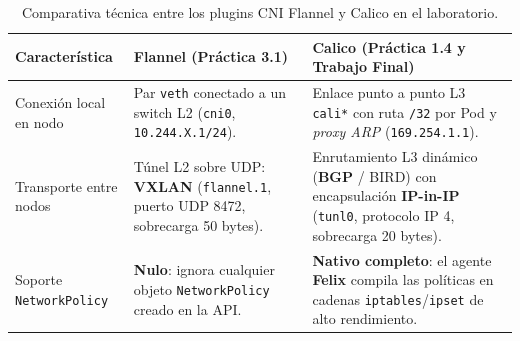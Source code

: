 \begin{table}[H]
\centering
\small
\renewcommand{\arraystretch}{1.25}
\begin{tabularx}{\textwidth}{l X X}
\toprule
\textbf{Característica} & \textbf{Flannel (Práctica 3.1)} & \textbf{Calico (Práctica 1.4 y Trabajo Final)} \\
\midrule
Conexión local en nodo & Par \texttt{veth} conectado a un switch L2 (\texttt{cni0}, \texttt{10.244.X.1/24}). & Enlace punto a punto L3 \texttt{cali*} con ruta \texttt{/32} por Pod y \textit{proxy ARP} (\texttt{169.254.1.1}). \\
Transporte entre nodos & Túnel L2 sobre UDP: \textbf{VXLAN} (\texttt{flannel.1}, puerto UDP 8472, sobrecarga 50 bytes). & Enrutamiento L3 dinámico (\textbf{BGP} / BIRD) con encapsulación \textbf{IP-in-IP} (\texttt{tunl0}, protocolo IP 4, sobrecarga 20 bytes). \\
Soporte \texttt{NetworkPolicy} & \textbf{Nulo}: ignora cualquier objeto \texttt{NetworkPolicy} creado en la API. & \textbf{Nativo completo}: el agente \textbf{Felix} compila las políticas en cadenas \texttt{iptables}/\texttt{ipset} de alto rendimiento. \\
\bottomrule
\end{tabularx}
\caption{Comparativa técnica entre los plugins CNI Flannel y Calico en el laboratorio.}
\label{tab:flannel-vs-calico}
\end{table}

